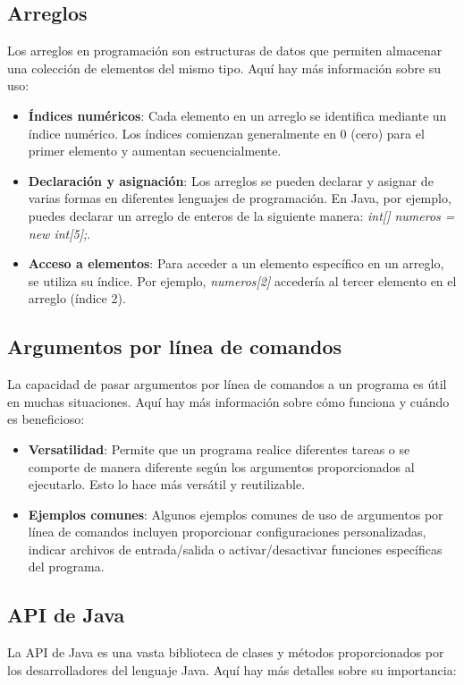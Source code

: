 \documentclass[11pt, twocolumn]{article}
\begin{document}
  \subsection*{Arreglos}
  Los arreglos en programación son estructuras de datos que permiten almacenar una colección de elementos del mismo tipo. Aquí hay más información sobre su uso:

  \begin{itemize}
    \item \textbf{Índices numéricos}: Cada elemento en un arreglo se identifica mediante un índice numérico. Los índices comienzan generalmente en 0 (cero) para el primer elemento y aumentan secuencialmente.
    \item \textbf{Declaración y asignación}: Los arreglos se pueden declarar y asignar de varias formas en diferentes lenguajes de programación. En Java, por ejemplo, puedes declarar un arreglo de enteros de la siguiente manera: \textit{int[] numeros = new int[5];}.
    \item \textbf{Acceso a elementos}: Para acceder a un elemento específico en un arreglo, se utiliza su índice. Por ejemplo, \textit{numeros[2]} accedería al tercer elemento en el arreglo (índice 2).
  \end{itemize}

  \subsection*{Argumentos por línea de comandos}
  La capacidad de pasar argumentos por línea de comandos a un programa es útil en muchas situaciones. Aquí hay más información sobre cómo funciona y cuándo es beneficioso:

  \begin{itemize}
    \item \textbf{Versatilidad}: Permite que un programa realice diferentes tareas o se comporte de manera diferente según los argumentos proporcionados al ejecutarlo. Esto lo hace más versátil y reutilizable.
    \item \textbf{Ejemplos comunes}: Algunos ejemplos comunes de uso de argumentos por línea de comandos incluyen proporcionar configuraciones personalizadas, indicar archivos de entrada/salida o activar/desactivar funciones específicas del programa.
  \end{itemize}

  \subsection*{API de Java}
  La API de Java es una vasta biblioteca de clases y métodos proporcionados por los desarrolladores del lenguaje Java. Aquí hay más detalles sobre su importancia:
\end{document}
